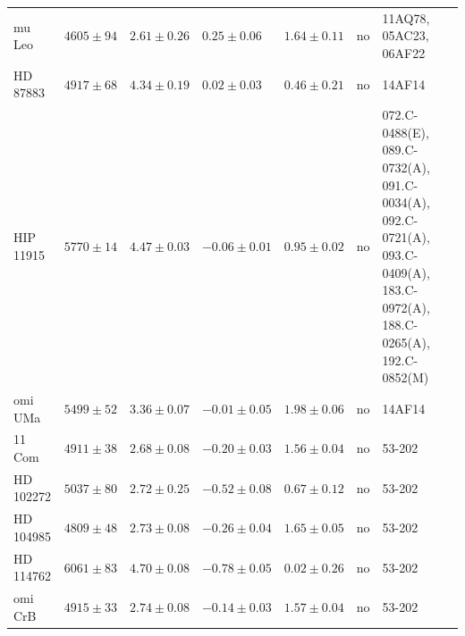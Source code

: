 \documentclass{aa}
\begin{document}
\begin{table}[htb!]
\begin{tabular}{lllllll}
       mu Leo     &  $4605 \pm  94$      &  $2.61 \pm 0.26$    &  $ 0.25 \pm 0.06$    &  $1.64 \pm 0.11$             &             no              &  11AQ78, 05AC23, 06AF22                                                                                                  \\
     HD 87883     &  $4917 \pm  68$      &  $4.34 \pm 0.19$    &  $ 0.02 \pm 0.03$    &  $0.46 \pm 0.21$             &             no              &  14AF14                                                                                                                  \\
    HIP 11915     &  $5770 \pm  14$      &  $4.47 \pm 0.03$    &  $-0.06 \pm 0.01$    &  $0.95 \pm 0.02$             &             no              &  072.C-0488(E), 089.C-0732(A), 091.C-0034(A), 092.C-0721(A), 093.C-0409(A), 183.C-0972(A), 188.C-0265(A), 192.C-0852(M)  \\
      omi UMa     &  $5499 \pm  52$      &  $3.36 \pm 0.07$    &  $-0.01 \pm 0.05$    &  $1.98 \pm 0.06$             &             no              &  14AF14                                                                                                                  \\
       11 Com     &  $4911 \pm  38$      &  $2.68 \pm 0.08$    &  $-0.20 \pm 0.03$    &  $1.56 \pm 0.04$             &             no              &  53-202                                                                                                                  \\
    HD 102272     &  $5037 \pm  80$      &  $2.72 \pm 0.25$    &  $-0.52 \pm 0.08$    &  $0.67 \pm 0.12$             &             no              &  53-202                                                                                                                  \\
    HD 104985     &  $4809 \pm  48$      &  $2.73 \pm 0.08$    &  $-0.26 \pm 0.04$    &  $1.65 \pm 0.05$             &             no              &  53-202                                                                                                                  \\
    HD 114762     &  $6061 \pm  83$      &  $4.70 \pm 0.08$    &  $-0.78 \pm 0.05$    &  $0.02 \pm 0.26$             &             no              &  53-202                                                                                                                  \\
      omi CrB     &  $4915 \pm  33$      &  $2.74 \pm 0.08$    &  $-0.14 \pm 0.03$    &  $1.57 \pm 0.04$             &             no              &  53-202                                                                                                                  \\

\end{tabular}
\end{table}
\end{document}
